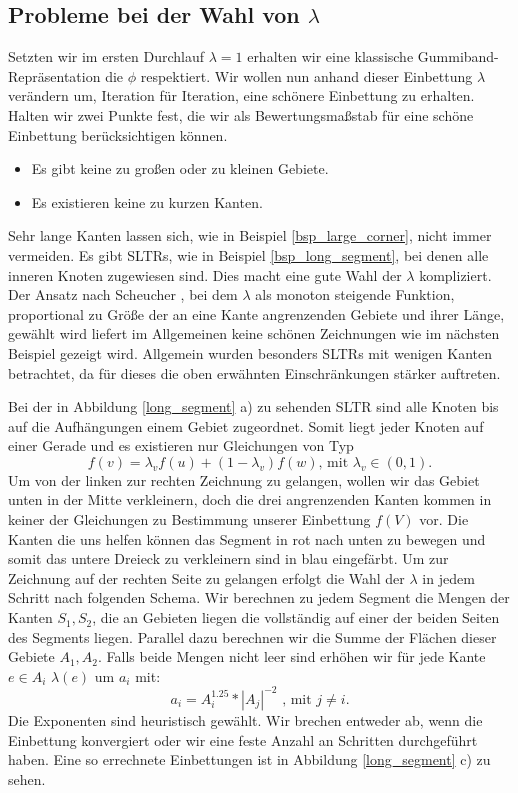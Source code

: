 \subsection{Probleme bei der Wahl von $\lambda$}

Setzten wir im ersten Durchlauf $\lambda = 1$ erhalten wir eine klassische Gummiband-Repräsentation die $\phi$ respektiert. Wir wollen nun anhand dieser Einbettung $\lambda$ verändern um, Iteration für Iteration, eine \glqq schönere\grqq{ } Einbettung zu erhalten. Halten wir zwei Punkte fest, die wir als Bewertungsmaßstab für eine schöne Einbettung berücksichtigen können.
\begin{itemize}
\item Es gibt keine zu großen oder zu kleinen Gebiete.
\item Es existieren keine zu kurzen Kanten.
\end{itemize}

Sehr lange Kanten lassen sich, wie in Beispiel \ref{bsp_large_corner}, nicht immer vermeiden. Es gibt SLTRs, wie in Beispiel \ref{bsp_long_segment}, bei denen alle inneren Knoten zugewiesen sind. Dies macht eine gute Wahl der $\lambda$ kompliziert. Der Ansatz nach Scheucher \cite{fs17}, bei dem $\lambda$ als monoton steigende Funktion, proportional zu Größe der an eine Kante angrenzenden Gebiete und ihrer Länge, gewählt wird liefert im Allgemeinen keine schönen Zeichnungen wie im nächsten Beispiel gezeigt wird. Allgemein wurden besonders SLTRs mit wenigen Kanten betrachtet, da für dieses die oben erwähnten Einschränkungen stärker auftreten.

\begin{example}\label{bsp_long_segment}\label{bsp_long_segment}
Bei der in Abbildung \ref{long_segment} a) zu sehenden SLTR sind alle Knoten bis auf die Aufhängungen einem Gebiet zugeordnet. Somit liegt jeder Knoten auf einer Gerade und es existieren nur Gleichungen von Typ
$$ f(v) = \lambda_v f(u) + (1-\lambda_v)f(w) \text{, mit } \lambda_v \in (0,1).$$
Um von der linken zur rechten Zeichnung zu gelangen, wollen wir das Gebiet unten in der Mitte verkleinern, doch die drei angrenzenden Kanten kommen in keiner der Gleichungen zu Bestimmung unserer Einbettung $f(V)$ vor. Die Kanten die uns helfen können das Segment in rot nach unten zu bewegen und somit das untere Dreieck zu verkleinern sind in blau eingefärbt. Um zur Zeichnung auf der rechten Seite zu gelangen erfolgt die Wahl der $\lambda$ in jedem Schritt nach folgenden Schema. Wir berechnen zu jedem Segment die Mengen der Kanten $S_1,S_2$, die an Gebieten liegen die vollständig auf einer der beiden Seiten des Segments liegen. Parallel dazu berechnen wir die Summe der Flächen dieser Gebiete $A_1,A_2$. Falls beide Mengen nicht leer sind erhöhen wir für jede Kante $e \in A_i$ $\lambda(e)$ um $a_i$ mit:
$$ a_i = A_i^{1.25}*|A_j|^{-2} \text{ , mit } j \neq i.$$
Die Exponenten sind heuristisch gewählt. Wir brechen entweder ab, wenn die Einbettung konvergiert oder wir eine feste Anzahl an Schritten durchgeführt haben. Eine so errechnete Einbettungen ist in Abbildung \ref{long_segment} c) zu sehen.
\end{example}

